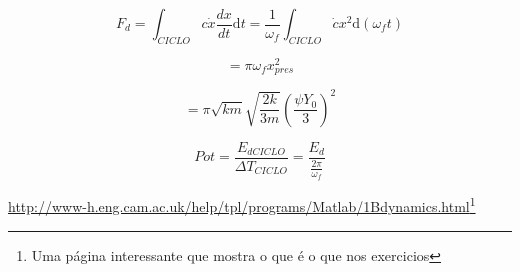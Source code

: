 \documentclass[a4paper, 12pt]{article}
\begin{document}
\[	F_{d}=\int_{CICLO}^{}{c\dot{x}\frac{dx}{dt}\text{d}t}=\frac{1}{\omega_{f}}\int_{CICLO}^{}{\dot{c}x^{2}\text{d}(\omega_{f}t)}\]

\[ = \pi\omega_{f}x_{p res}^{2}\]

\[ = \pi\sqrt{km}\sqrt{\frac{2k}{3m}}(\frac{\psi Y_{0}}{3})^{2}\]

\[Pot = \frac{E_{d CICLO}}{\Delta T _{CICLO}} = \frac{E_{d}}{\frac{2\pi}{\omega_{f}}}\]

\url{http://www-h.eng.cam.ac.uk/help/tpl/programs/Matlab/1Bdynamics.html}\footnote{Uma página interessante que mostra o que é o que nos exercicios}
	

	
	
	
\end{document}
